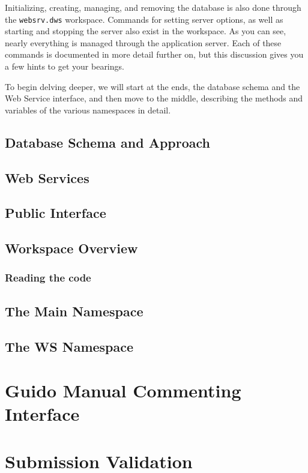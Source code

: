 Initializing, creating, managing, and removing the database is also done through
the {\tt websrv.dws} workspace. Commands for setting server options, as well as
starting and stopping the server also exist in the workspace. As you can see, 
nearly everything is managed through the application server. Each of these 
commands is documented in more detail further on, but this discussion gives you 
a few hints to get your bearings.

To begin delving deeper, we will start at the ends, the database schema and 
the Web Service interface, and then move to the middle, describing the methods 
and variables of the various namespaces in detail.

\section{Database Schema and Approach}

\section{Web Services}

\section{Public Interface}

\section{Workspace Overview}

\subsection{Reading the code}

\section{The Main Namespace}

\section{The WS Namespace}

\chapter{Guido Manual Commenting Interface}

\chapter{Submission Validation}

